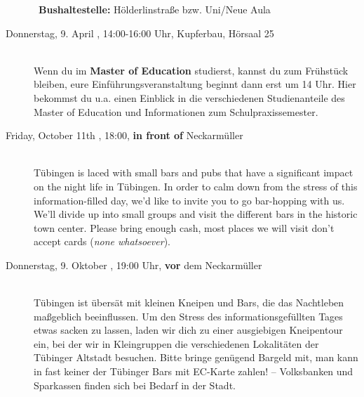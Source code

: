 \begin{description}
    ~\textbf{Bushaltestelle:} Hölderlinstraße bzw. Uni/Neue Aula

    \item[Donnerstag, 9. April \YEAR, 14:00-16:00 Uhr, Kupferbau, Hörsaal 25]\ \\
        Wenn du im \textbf{Master of Education} studierst, kannst du zum Frühstück bleiben, eure Einführungsveranstaltung beginnt dann erst um 14 Uhr. Hier bekommst du u.a. einen Einblick in die verschiedenen Studienanteile des Master of Education und Informationen zum Schulpraxissemester.
\fi

\ifml
	\item[Friday, October 11th \YEAR, 18:00, \textbf{in front of} Neckarmüller]\ \\
        Tübingen is laced with small bars and pubs that have a significant impact on the night life in Tübingen. In order to calm down from the stress of this information-filled day, we'd like to invite you to go bar-hopping with us. We'll divide up into small groups and visit the different bars in the historic town center. Please bring enough cash, most places we will visit don't accept cards (\emph{none whatsoever}).

	\else
	\item[Donnerstag, 9. Oktober \YEAR, 19:00 Uhr, \textbf{vor} dem Neckarmüller]\ \\
        Tübingen ist übersät mit kleinen Kneipen und Bars, die das Nachtleben maßgeblich beeinflussen. Um den Stress des informationsgefüllten Tages etwas sacken zu lassen, laden wir dich zu einer ausgiebigen Kneipentour ein, bei der wir in Kleingruppen die verschiedenen Lokalitäten der Tübinger Altstadt besuchen. Bitte bringe genügend Bargeld mit, man kann in fast keiner der Tübinger Bars mit EC-Karte zahlen! -- Volksbanken und Sparkassen finden sich bei Bedarf in der Stadt.

\fi




\end{description}
